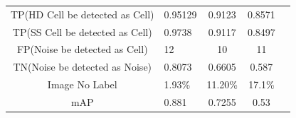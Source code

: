 \begin{table}[t]
{\begin{tabular}{@{}clccc@{}}
TP(HD Cell be detected as Cell)                & 0.95129                                                                                                             & 0.9123                                                                                                                              & 0.8571                                                                                                                                                            \\
TP(SS Cell be detected as Cell)                & 0.9738                                                                                                              & 0.9117                                                                                                                              & 0.8497                                                                                                                                                            \\
FP(Noise be detected as Cell)                  & 12                                                                                                                  & 10                                                                                                                                  & 11                                                                                                                                                                \\
TN(Noise be detected as Noise)                 & 0.8073                                                                                                              & 0.6605                                                                                                                              & 0.587                                                                                                                                                             \\
Image No Label                                 & 1.93\%                                                                                                              & 11.20\%                                                                                                                             & 17.1\%                                                                                                                                                            \\
mAP                                            & 0.881                                                                                                               & 0.7255                                                                                                                              & 0.53                                                                                                                                                              \\

\end{tabular}}
\end{table}
